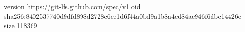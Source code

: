 version https://git-lfs.github.com/spec/v1
oid sha256:8402537740d9dfd898d2728c6ee1d6f44a0bd9a1b8a4ed84ac946f6dbc14426e
size 118369
